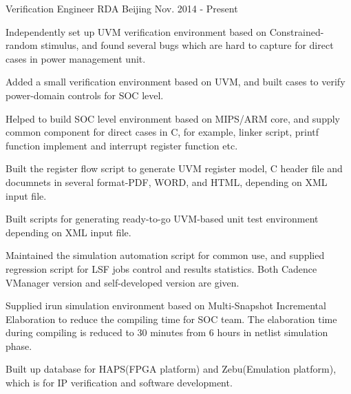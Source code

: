 


\begin{cventries}


\cventry
{Verification Engineer} %
{RDA} %
{Beijing} %
{Nov. 2014 - Present} %
{ %
\begin{cvitems}
\item {Independently set up UVM verification environment based on Constrained-random stimulus, and found several bugs which are hard to capture for direct cases in power management unit.}
\item {Added a small verification environment based on UVM, and built cases to verify power-domain controls for SOC level.}
\item {Helped to build SOC level environment based on MIPS/ARM core, and supply common component for direct cases in C, for example, linker script, printf function implement and interrupt register function etc.}
\item {Built the register flow script to generate UVM register model, C header file and documnets in several format-PDF, WORD, and HTML, depending on XML input file.}
\item {Built scripts for generating ready-to-go UVM-based unit test environment depending on XML input file.}
\item {Maintained the simulation automation script for common use, and supplied regression script for LSF jobs control and results statistics. Both Cadence VManager version and self-developed version are given.}
\item {Supplied irun simulation environment based on Multi-Snapshot Incremental Elaboration to reduce the compiling time for SOC team. The elaboration time during compiling is reduced to 30 minutes from 6 hours in netlist simulation phase.}
\item {Built up database for HAPS(FPGA platform) and Zebu(Emulation platform), which is for IP verification and software development.}
\end{cvitems}
}



\end{cventries}

